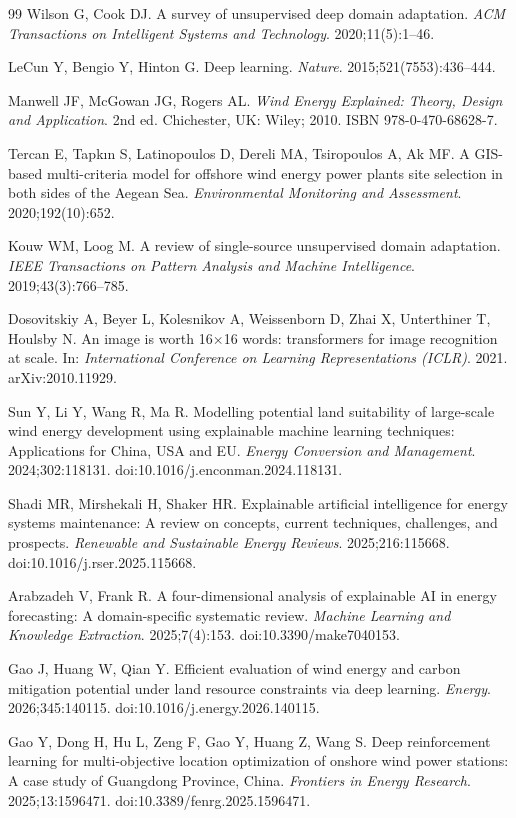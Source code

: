 \documentclass[12pt, a4paper]{article}
\begin{document}
\begin{thebibliography}{99}
Wilson G, Cook DJ.
A survey of unsupervised deep domain adaptation.
\textit{ACM Transactions on Intelligent Systems and Technology}.
2020;11(5):1--46.

LeCun Y, Bengio Y, Hinton G.
Deep learning.
\textit{Nature}.
2015;521(7553):436--444.

Manwell JF, McGowan JG, Rogers AL.
\textit{Wind Energy Explained: Theory, Design and Application}.
2nd ed. Chichester, UK: Wiley; 2010.
ISBN 978-0-470-68628-7.

Tercan E, Tapkın S, Latinopoulos D, Dereli MA, Tsiropoulos A,
Ak MF.
A GIS-based multi-criteria model for offshore wind energy power
plants site selection in both sides of the Aegean Sea.
\textit{Environmental Monitoring and Assessment}.
2020;192(10):652.

Kouw WM, Loog M.
A review of single-source unsupervised domain adaptation.
\textit{IEEE Transactions on Pattern Analysis and Machine
Intelligence}.
2019;43(3):766--785.

Dosovitskiy A, Beyer L, Kolesnikov A, Weissenborn D, Zhai X,
Unterthiner T, Houlsby N.
An image is worth 16$\times$16 words: transformers for image
recognition at scale.
In: \textit{International Conference on Learning Representations
(ICLR)}. 2021.
arXiv:2010.11929.

Sun Y, Li Y, Wang R, Ma R.
Modelling potential land suitability of large-scale wind energy
development using explainable machine learning techniques:
Applications for China, USA and EU.
\textit{Energy Conversion and Management}.
2024;302:118131.
doi:10.1016/j.enconman.2024.118131.

Shadi MR, Mirshekali H, Shaker HR.
Explainable artificial intelligence for energy systems
maintenance: A review on concepts, current techniques,
challenges, and prospects.
\textit{Renewable and Sustainable Energy Reviews}.
2025;216:115668.
doi:10.1016/j.rser.2025.115668.

Arabzadeh V, Frank R.
A four-dimensional analysis of explainable AI in energy
forecasting: A domain-specific systematic review.
\textit{Machine Learning and Knowledge Extraction}.
2025;7(4):153.
doi:10.3390/make7040153.

Gao J, Huang W, Qian Y.
Efficient evaluation of wind energy and carbon mitigation
potential under land resource constraints via deep learning.
\textit{Energy}.
2026;345:140115.
doi:10.1016/j.energy.2026.140115.

Gao Y, Dong H, Hu L, Zeng F, Gao Y, Huang Z, Wang S.
Deep reinforcement learning for multi-objective location
optimization of onshore wind power stations: A case study of
Guangdong Province, China.
\textit{Frontiers in Energy Research}.
2025;13:1596471.
doi:10.3389/fenrg.2025.1596471.

\end{thebibliography}
\end{document}
